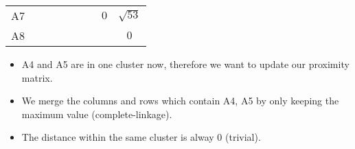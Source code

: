 \documentclass[aspectratio=169, 10pt]{beamer}
\begin{document}
\begin{frame}[t]
\begin{table}[]
\begin{tabular}{c|cccggccc}
        A7                                              &     &             &             &                                    &                                    &                                   & $0$                                & $\sqrt{53}$                        \\
        A8                                              &     &             &             &                                    &                                    &                                   &                                    & $0$                               
        \end{tabular}
    \end{table}

    \begin{itemize}
        \item A4 and A5 are in one cluster now, therefore we want to update our proximity matrix.
        \item We merge the columns and rows which contain A4, A5 by only keeping the maximum value (complete-linkage).
        \item The distance within the same cluster is alway 0 (trivial). 
    \end{itemize}

\end{frame}
\end{document}
